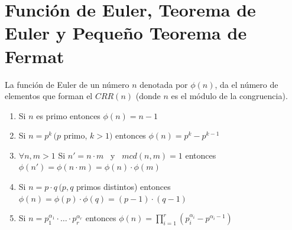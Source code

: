 \section{Función de Euler, Teorema de Euler y Pequeño Teorema de Fermat}
La función de Euler de un número $n$ denotada por $\phi(n)$, da el número de elementos que forman el $CRR(n)$ (donde $n$ es el módulo de la congruencia).

\begin{enunciado} \label{enun:propTotiente}\leavevmode\par
\begin{enumerate}[label=\roman*)]
\item Si $n$ es primo entonces $\phi(n)=n-1$
\item Si $n=p^{k} \, (p$ primo, $k>1)$ entonces $\phi(n)=p^{k}-p^{k-1}$
\item $\forall n, m>1$ Si $n'=n \cdot m$ \, y \, $mcd(n, m)=1$ entonces $\phi(n')=\phi(n \cdot m)=\phi(n) \cdot \phi(m)$
\item Si $n=p \cdot q \, (p, q$ primos distintos) entonces $\phi(n)=\phi(p) \cdot \phi(q)=(p-1) \cdot(q-1)$
\item Si $n=p_{1}^{\alpha_{1}} \cdot \ldots \cdot p_{r}^{\alpha_r}$ entonces $\phi(n)=\prod_{i=1}^{r}(p_{i}^{\alpha_i}-p^{\alpha_{i}-1})$
\end{enumerate}
\end{enunciado}

